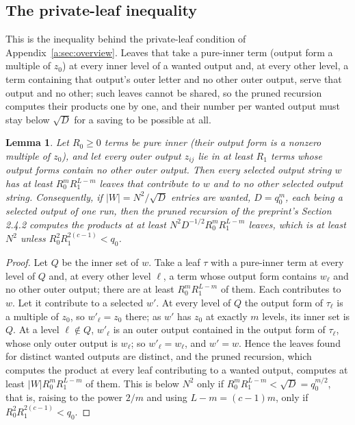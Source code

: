 \documentclass[11pt]{article}
\newtheorem{lemma}[theorem]{Lemma}
\theoremstyle{definition}
\theoremstyle{remark}
\begin{document}
\subsection{The private-leaf inequality}\label{a:sec:private}

This is the inequality behind the private-leaf condition of Appendix~\ref{a:sec:overview}. Leaves that take a pure-inner term (output form a multiple of $z_0$) at every inner level of a wanted output and, at every other level, a term containing that output's outer letter and no other outer output, serve that output and no other; such leaves cannot be shared, so the pruned recursion computes their products one by one, and their number per wanted output must stay below $\sqrt D$ for a saving to be possible at all.

\begin{lemma}\label{a:lem:private}
Let $R_0\ge0$ terms be \emph{pure inner} (their output form is a nonzero multiple of $z_0$), and let every outer output $z_{ij}$ lie in at least $R_1$ terms whose output forms contain no other outer output. Then every selected output string $w$ has at least $R_0^mR_1^{L-m}$ leaves that contribute to $w$ and to no other selected output string. Consequently, if $|W|=N^2/\sqrt D$ entries are wanted, $D=q_0^m$, each being a selected output of one run, then the pruned recursion of the preprint's Section 2.4.2 computes the products at at least $N^2D^{-1/2}R_0^mR_1^{L-m}$ leaves, which is at least $N^2$ unless $R_0^2R_1^{2(c-1)}<q_0$.
\end{lemma}

\begin{proof}
Let $Q$ be the inner set of $w$. Take a leaf $\tau$ with a pure-inner term at every level of $Q$ and, at every other level $\ell$, a term whose output form contains $w_\ell$ and no other outer output; there are at least $R_0^mR_1^{L-m}$ of them. Each contributes to $w$. Let it contribute to a selected $w'$. At every level of $Q$ the output form of $\tau_\ell$ is a multiple of $z_0$, so $w'_\ell=z_0$ there; as $w'$ has $z_0$ at exactly $m$ levels, its inner set is $Q$. At a level $\ell\notin Q$, $w'_\ell$ is an outer output contained in the output form of $\tau_\ell$, whose only outer output is $w_\ell$; so $w'_\ell=w_\ell$, and $w'=w$. Hence the leaves found for distinct wanted outputs are distinct, and the pruned recursion, which computes the product at every leaf contributing to a wanted output, computes at least $|W|R_0^mR_1^{L-m}$ of them. This is below $N^2$ only if $R_0^mR_1^{L-m}<\sqrt D=q_0^{m/2}$, that is, raising to the power $2/m$ and using $L-m=(c-1)m$, only if $R_0^2R_1^{2(c-1)}<q_0$.
\end{proof}
\end{document}
